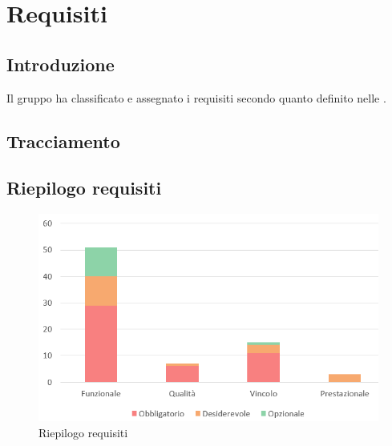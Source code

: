 \section{Requisiti}
\subsection{Introduzione}
Il gruppo \Gruppo{} ha classificato e assegnato i requisiti secondo quanto definito nelle .




\newpage

\newpage
\subsection{Tracciamento}



\subsection{Riepilogo requisiti}

\begin{figure}[h]
\includegraphics[width=14cm]{section/Images/riepilogoReq}
\centering
\caption{Riepilogo requisiti}
\end{figure}

